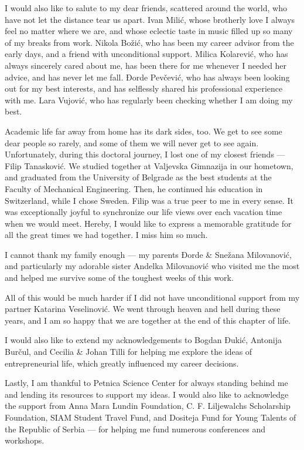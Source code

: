\documentclass{UUThesisTemplate}
\begin{document}
{\par
I would also like to salute to my dear friends, scattered around the world, who have not let the distance tear us apart. Ivan Milić, whose brotherly love I always feel no matter where we are, and whose eclectic taste in music filled up so many of my breaks from work. Nikola Božić, who has been my career advisor from the early days, and a friend with unconditional support. Milica Kolarević, who has always sincerely cared about me, has been there for me whenever I needed her advice, and has never let me fall. Đorde Pevčević, who has always been looking out for my best interests, and has selflessly shared his professional experience with me. Lara Vujović, who has regularly been checking whether I am doing my best.
\par
Academic life far away from home has its dark sides, too. We get to see some dear people so rarely, and some of them we will never get to see again. Unfortunately, during this doctoral journey, I lost one of my closest friends --- Filip Tanasković. We studied together at Valjevska Gimnazija in our hometown, and graduated from the University of Belgrade as the best students at the Faculty of Mechanical Engineering. Then, he continued his education in Switzerland, while I chose Sweden. Filip was a true peer to me in every sense. It was exceptionally joyful to synchronize our life views over each vacation time when we would meet. Hereby, I would like to express a memorable gratitude for all the great times we had together. I miss him so much.

\par
I cannot thank my family enough --- my parents Đorde \& Snežana Milovanović, and particularly my adorable sister Andelka Milovanović who visited me the most and helped me survive some of the toughest weeks of this work.

\par
All of this would be much harder if I did not have unconditional support from my partner Katarina Veselinović. We went through heaven and hell during these years, and I am so happy that we are together at the end of this chapter of life.

\par
I would also like to extend my acknowledgements to Bogdan Đukić, Antonija Burčul, and Cecilia \& Johan Tilli for helping me explore the ideas of entrepreneurial life, which greatly influenced my career decisions. 

\par
Lastly, I am thankful to Petnica Science Center for always standing behind me and lending its resources to support my ideas. I would also like to acknowledge the support from Anna Mara Lundin Foundation, C. F. Liljewalchs Scholarship Foundation, SIAM Student Travel Fund, and Dositeja Fund for Young Talents of the Republic of Serbia --- for helping me fund numerous conferences and workshops.
}
\end{document}
